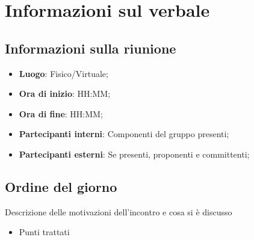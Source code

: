 \section{Informazioni sul verbale}

\subsection{Informazioni sulla riunione}

\begin{itemize}
	\item \textbf{Luogo}: Fisico/Virtuale;
	\item \textbf{Ora di inizio}: HH:MM;
	\item \textbf{Ora di fine}: HH:MM;
	\item \textbf{Partecipanti interni}: Componenti del gruppo presenti;
	\item \textbf{Partecipanti esterni}: Se presenti, proponenti e committenti;
\end{itemize}

\medskip

\subsection{Ordine del giorno}
Descrizione delle motivazioni dell'incontro e cosa si è discusso
\begin{itemize}
	\item Punti trattati
\end{itemize}
